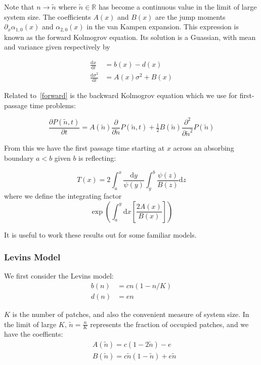 \documentclass[letterpaper,10pt]{article}
\newcommand{\ud}{\mathrm{d}}
\begin{document}
Note that $n\to \tilde n$ where $\tilde n \in \mathbb{R}$ has become a continuous value in the limit of large system size.  The coefficients $A(x)$ and $B(x)$ are the jump moments $\partial_x \alpha_{1,0}(x)$ and $\alpha_{2,0}(x)$ in the van Kampen expansion.  This expression is known as the forward Kolmogrov equation.  Its solution is a Guassian, with mean and variance given respectively by

\begin{align}
\frac{\ud x }{\ud t} &= b(x)-d(x) \nonumber \\
\frac{\ud \sigma^2}{\ud t} &= A(x) \sigma^2 + B(x)
\label{moments}
\end{align}



Related to~\eqref{forward} is the backward Kolmogrov equation which we use for first-passage time problems:

\begin{equation}
\frac{\partial P(\tilde n,t)}{\partial t} = A(\tilde n) \frac{\partial}{\partial \tilde n}  P(\tilde n,t)+ \tfrac{1}{2}  B(\tilde n)\frac{\partial^2}{\partial \tilde n^2} P(\tilde n)
\label{backward}
\end{equation}

From this we have the first passage time starting at $x$ across an absorbing boundary $a < b$ given $b$ is reflecting:

\begin{equation}
T(x) = 2 \int^x_a \frac{\ud y}{\psi(y)} \int_y^b \frac{\psi(z) }{B(z)} \ud z
\label{firstpassage}
\end{equation}
where we define the integrating factor 
\begin{equation}
\exp\left( \int_a^y \ud x \left[ \frac{2 A(x)}{B(x)} \right] \right)
\label{integrating factor}
\end{equation}

It is useful to work these results out for some familiar models.  
\subsubsection*{Levins Model}
We first consider the Levins model:
\begin{align}
b(n) &= c n \left( 1 - n/K \right) \nonumber \\
d(n) &= e n
\label{levins}
\end{align}

$K$ is the number of patches, and also the convenient measure of system size.  In the limit of large $K$, $\tilde n = \tfrac{n}{K}$ represents the fraction of occupied patches, and we have the coeffients:
\begin{align*}
& A(\tilde n) = c(1-2 \tilde n)-e \\
& B(\tilde n) = c \tilde n (1 - \tilde n) + e \tilde n
\end{align*}
\end{document}
